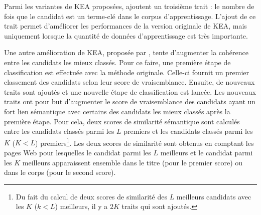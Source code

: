         Parmi les variantes de KEA proposées, 
        ajoutent un troisième trait : le nombre de fois que le candidat est un
        terme-clé dans le corpus d'apprentissage. L'ajout de ce trait permet
        d'améliorer les performances de la version originale de KEA, mais
        uniquement lorsque la quantité de données d'apprentissage est très
        importante.
        
        Une autre amélioration de KEA, proposée par
        , tente d'augmenter la cohérence entre
        les candidats les mieux classés. Pour ce faire, une première étape de
        classification est effectuée avec la méthode originale. Celle-ci
        fournit un premier classement des candidats selon leur score de
        vraisemblance. Ensuite, de nouveaux traits sont ajoutés et une
        nouvelle étape de classification est lancée. Les nouveaux traits ont
        pour but d'augmenter le score de vraisemblance des candidats ayant un
        fort lien sémantique avec certains des candidats les mieux classés
        après la première étape. Pour cela, deux scores de similarité
        sémantique sont calculés entre les candidats classés parmi les $L$
        premiers et les candidats classés parmi les $K$ ($K < L$)
        premiers\footnote{Du fait du calcul de deux scores de similarité des
        $L$ meilleurs candidats avec les $K$ ($k < L$) meilleurs, il y a $2K$
        traits qui sont ajoutés.}. Les deux scores de similarité sont obtenus
        en comptant les pages Web pour lesquelles le candidat parmi les $L$
        meilleurs et le candidat parmi les $K$ meilleurs apparaissent ensemble
        dans le titre (pour le premier score) ou dans le corps (pour le second
        score).

